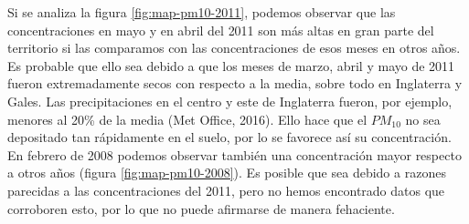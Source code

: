 \documentclass[12pt]{article}
\begin{document}
Si se analiza la figura \ref{fig:map-pm10-2011}, podemos observar que las concentraciones en mayo y en abril del 2011 son más altas en gran parte del territorio si las comparamos con las concentraciones de esos meses en otros años. Es probable que ello sea debido a que los meses de marzo, abril y mayo de 2011 fueron extremadamente secos con respecto a la media, sobre todo en Inglaterra y Gales. Las precipitaciones en el centro y este de Inglaterra fueron, por ejemplo, menores al 20\% de la media (Met Office, 2016). Ello hace que el $PM_{10}$ no sea depositado tan rápidamente en el suelo, por lo se favorece así su concentración. En febrero de 2008 podemos observar también una concentración mayor respecto a otros años (figura \ref{fig:map-pm10-2008}). Es posible que sea debido a razones parecidas a las concentraciones del 2011, pero no hemos encontrado datos que corroboren esto, por lo que no puede afirmarse de manera fehaciente.
\end{document}
